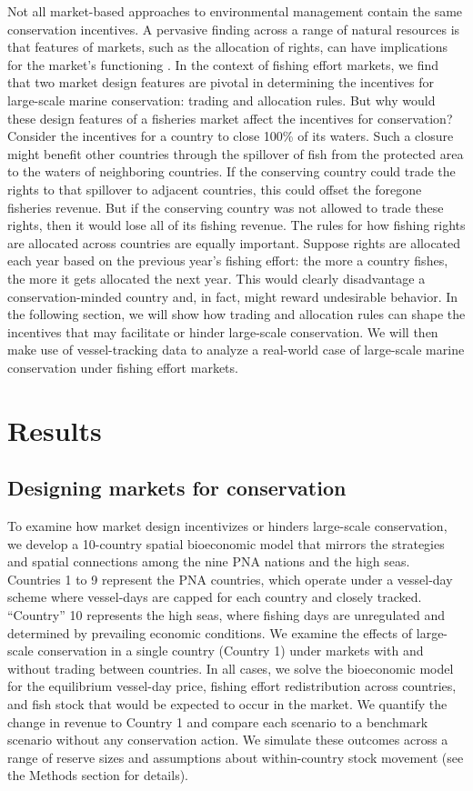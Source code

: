 \documentclass[12pt]{article}
\begin{document}
Not all market-based approaches to environmental management contain the same conservation incentives. A pervasive finding across a range of natural resources is that features of markets, such as the allocation of rights, can have implications for the market's functioning \cite{libecap_1989}. In the context of fishing effort markets, we find that two market design features are pivotal in determining the incentives for large-scale marine conservation: trading and allocation rules. But why would these design features of a fisheries market affect the incentives for conservation? Consider the incentives for a country to close 100\% of its waters. Such a closure might benefit other countries through the spillover of fish from the protected area to the waters of neighboring countries. If the conserving country could trade the rights to that spillover to adjacent countries, this could offset the foregone fisheries revenue. But if the conserving country was not allowed to trade these rights, then it would lose all of its fishing revenue. The rules for how fishing rights are allocated across countries are equally important. Suppose rights are allocated each year based on the previous year's fishing effort: the more a country fishes, the more it gets allocated the next year. This would clearly disadvantage a conservation-minded country and, in fact, might reward undesirable behavior. In the following section, we will show how trading and allocation rules can shape the incentives that may facilitate or hinder large-scale conservation. We will then make use of vessel-tracking data to analyze a real-world case of large-scale marine conservation under fishing effort markets.

\section{Results}

\subsection{Designing markets for conservation}

To examine how market design incentivizes or hinders large-scale conservation, we develop a 10-country spatial bioeconomic model that mirrors the strategies and spatial connections among the nine PNA nations and the high seas. Countries 1 to 9 represent the PNA countries, which operate under a vessel-day scheme where vessel-days are capped for each country and closely tracked. ``Country'' 10 represents the high seas, where fishing days are unregulated and determined by prevailing economic conditions. We examine the effects of large-scale conservation in a single country (Country 1) under markets with and without trading between countries. In all cases, we solve the bioeconomic model for the equilibrium vessel-day price, fishing effort redistribution across countries, and fish stock that would be expected to occur in the market. We quantify the change in revenue to Country 1 and compare each scenario to a benchmark scenario without any conservation action. We simulate these outcomes across a range of reserve sizes and assumptions about within-country stock movement (see the Methods section for details).
\end{document}
